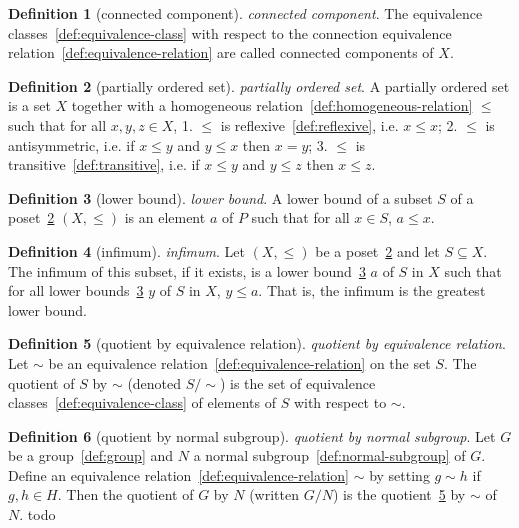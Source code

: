 \documentclass[12pt,a4paper]{article}
\theoremstyle{definition}
\newtheorem{definition}{Definition}
\begin{document}
\begin{definition}[connected component]\label{def:connected-component}
\emph{connected component}. The equivalence classes~\ref{def:equivalence-class} with respect to the connection equivalence relation~\ref{def:equivalence-relation} are called connected components of $X$.
\end{definition}

\begin{definition}[partially ordered set]\label{def:partially-ordered-set}
\emph{partially ordered set}. A partially ordered set is a set $X$ together with a homogeneous relation~\ref{def:homogeneous-relation} $\leq$ such that for all $x,y,z\in X$,
1. $\leq$ is reflexive~\ref{def:reflexive}, i.e. $x\leq x$;
2. $\leq$ is antisymmetric, i.e. if $x\leq y$ and $y\leq x$ then $x=y$;
3. $\leq$ is transitive~\ref{def:transitive}, i.e. if $x\leq y$ and $y\leq z$ then $x\leq z$.
\end{definition}

\begin{definition}[lower bound]\label{def:lower-bound}
\emph{lower bound}. A lower bound of a subset $S$ of a poset~\ref{def:partially-ordered-set} $(X,\leq)$ is an element $a$ of $P$ such that for all $x\in S$, $a\leq x$.
\end{definition}

\begin{definition}[infimum]\label{def:infimum}
\emph{infimum}. Let $(X,\leq)$ be a poset~\ref{def:partially-ordered-set} and let $S\subseteq X$. The infimum of this subset, if it exists, is a lower bound~\ref{def:lower-bound} $a$ of $S$ in $X$ such that for all lower bounds~\ref{def:lower-bound} $y$ of $S$ in $X$, $y\leq a$. That is, the infimum is the greatest lower bound.
\end{definition}

\begin{definition}[quotient by equivalence relation]\label{def:quotient-by-equivalence-relation}
\emph{quotient by equivalence relation}. Let $\sim$ be an equivalence relation~\ref{def:equivalence-relation} on the set $S$. The quotient of $S$ by $\sim$ (denoted $S/\sim$) is the set of equivalence classes~\ref{def:equivalence-class} of elements of $S$ with respect to $\sim$.
\end{definition}

\begin{definition}[quotient by normal subgroup]\label{def:quotient-by-normal-subgroup}
\emph{quotient by normal subgroup}. Let $G$ be a group~\ref{def:group} and $N$ a normal subgroup~\ref{def:normal-subgroup} of $G$. Define an equivalence relation~\ref{def:equivalence-relation} $\sim$ by setting $g\sim h$ if $g,h \in H$. Then the quotient of $G$ by $N$ (written $G/N$) is the quotient~\ref{def:quotient-by-equivalence-relation} by $\sim$ of $N$. todo
\end{definition}
\end{document}
